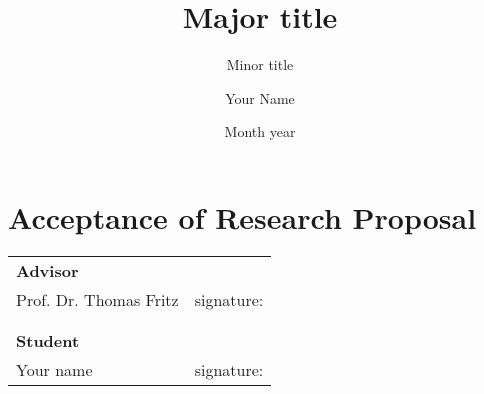 \documentclass{hasel_proposal}
\title{Major title}
\subtitle{Minor title}
\author{Your Name}
\date{Month year}
\begin{document}
\maketitle










\clearpage
\section*{Acceptance of Research Proposal}
\vspace*{1cm}
\begin{tabular}{p{6cm}p{7cm}}
{\bfseries Advisor}\\
Prof. Dr. Thomas Fritz & signature:\dotfill \\
\\
\\
{\bfseries Student}\\
Your name & signature:\dotfill
\end{tabular}

 


\end{document}
